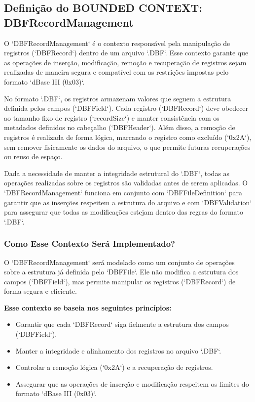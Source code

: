 \subsection{Definição do BOUNDED CONTEXT: DBFRecordManagement}

O `DBFRecordManagement` é o contexto responsável pela manipulação de registros (`DBFRecord`) dentro de um arquivo `.DBF`. Esse contexto garante que as operações de inserção, modificação, remoção e recuperação de registros sejam realizadas de maneira segura e compatível com as restrições impostas pelo formato `dBase III (0x03)`. 

No formato `.DBF`, os registros armazenam valores que seguem a estrutura definida pelos campos (`DBFField`). Cada registro (`DBFRecord`) deve obedecer ao tamanho fixo de registro (`recordSize`) e manter consistência com os metadados definidos no cabeçalho (`DBFHeader`). Além disso, a remoção de registros é realizada de forma lógica, marcando o registro como excluído (`0x2A`), sem remover fisicamente os dados do arquivo, o que permite futuras recuperações ou reuso de espaço.

Dada a necessidade de manter a integridade estrutural do `.DBF`, todas as operações realizadas sobre os registros são validadas antes de serem aplicadas. O `DBFRecordManagement` funciona em conjunto com `DBFFileDefinition` para garantir que as inserções respeitem a estrutura do arquivo e com `DBFValidation` para assegurar que todas as modificações estejam dentro das regras do formato `.DBF`.

\subsubsection{Como Esse Contexto Será Implementado?}

O `DBFRecordManagement` será modelado como um conjunto de operações sobre a estrutura já definida pelo `DBFFile`. Ele não modifica a estrutura dos campos (`DBFField`), mas permite manipular os registros (`DBFRecord`) de forma segura e eficiente.

\textbf{Esse contexto se baseia nos seguintes princípios:}
\begin{itemize}
    \item Garantir que cada `DBFRecord` siga fielmente a estrutura dos campos (`DBFField`).
    \item Manter a integridade e alinhamento dos registros no arquivo `.DBF`.
    \item Controlar a remoção lógica (`0x2A`) e a recuperação de registros.
    \item Assegurar que as operações de inserção e modificação respeitem os limites do formato `dBase III (0x03)`.
\end{itemize}

